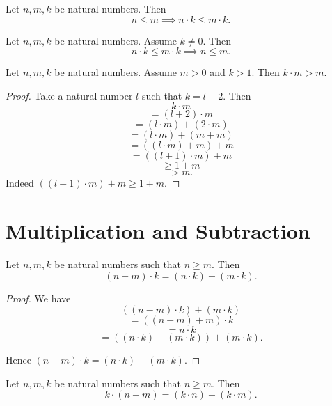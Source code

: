 \documentclass[10pt]{article}
\begin{document}
  \begin{forthel}
    \begin{corollary}
      Let $n, m, k$ be natural numbers.
      Then \[ n \leq m \implies n \cdot k \leq m \cdot k. \]
    \end{corollary}
  \end{forthel}

  \begin{forthel}
    \begin{corollary}
      Let $n, m, k$ be natural numbers.
      Assume $k \neq 0$.
      Then \[ n \cdot k \leq m \cdot k \implies n \leq m. \]
    \end{corollary}
  \end{forthel}

  \begin{forthel}
    \begin{proposition}
      Let $n, m, k$ be natural numbers.
      Assume $m > 0$ and $k > 1$.
      Then $k \cdot m > m$.
    \end{proposition}
    \begin{proof}
      Take a natural number $l$ such that $k = l + 2$.
      Then
      \[  k \cdot m                       \]
      \[    = (l + 2) \cdot m             \]
      \[    = (l \cdot m) + (2 \cdot m)   \]
      \[    = (l \cdot m) + (m + m)       \]
      \[    = ((l \cdot m) + m) + m       \]
      \[    = ((l + 1) \cdot m) + m       \]
      \[    \geq 1 + m                    \]
      \[    > m.                          \]
      Indeed $((l + 1) \cdot m) + m \geq 1 + m$.
    \end{proof}
  \end{forthel}


  \section{Multiplication and Subtraction}

  \begin{forthel}
    \begin{proposition}
      Let $n, m, k$ be natural numbers such that $n \geq m$.
      Then \[ (n - m) \cdot k = (n \cdot k) - (m \cdot k). \]
    \end{proposition}
    \begin{proof}
      We have
      \[  ((n - m) \cdot k) + (m \cdot k)                 \]
      \[    = ((n - m) + m) \cdot k                       \]
      \[    = n \cdot k                                   \]
      \[    = ((n \cdot k) - (m \cdot k)) + (m \cdot k).  \]

      Hence $(n - m) \cdot k = (n \cdot k) - (m \cdot k)$.
    \end{proof}
  \end{forthel}

  \begin{forthel}
    \begin{corollary}
      Let $n, m, k$ be natural numbers such that $n \geq m$.
      Then \[ k \cdot (n - m) = (k \cdot n) - (k \cdot m). \]
    \end{corollary}
  \end{forthel}
\end{document}
